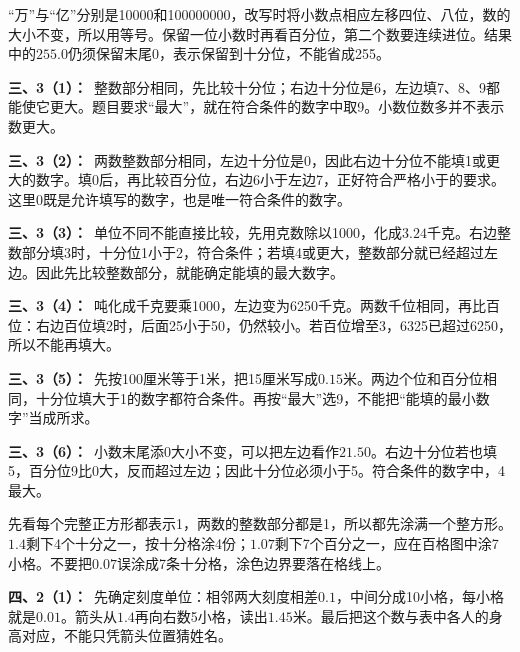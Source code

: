\documentclass[multi=snippet,border=0pt]{standalone}
\newenvironment{snippet}[3]{\begin{minipage}{#1bp}\color{answerred}\fontsize{#2}{#3}\selectfont\raggedright}{\end{minipage}}
\begin{document}
\begin{snippet}{505}{11.5}{14}“万”与“亿”分别是10000和100000000，改写时将小数点相应左移四位、八位，数的大小不变，所以用等号。保留一位小数时再看百分位，第二个数要连续进位。结果中的\(255.0\)仍须保留末尾0，表示保留到十分位，不能省成255。\end{snippet}
\begin{snippet}{505}{11.5}{14}\textbf{三、3（1）：}\ 整数部分相同，先比较十分位；右边十分位是6，左边填7、8、9都能使它更大。题目要求“最大”，就在符合条件的数字中取9。小数位数多并不表示数更大。\end{snippet}
\begin{snippet}{505}{11.5}{14}\textbf{三、3（2）：}\ 两数整数部分相同，左边十分位是0，因此右边十分位不能填1或更大的数字。填0后，再比较百分位，右边6小于左边7，正好符合严格小于的要求。这里0既是允许填写的数字，也是唯一符合条件的数字。\end{snippet}
\begin{snippet}{505}{11.5}{14}\textbf{三、3（3）：}\ 单位不同不能直接比较，先用克数除以1000，化成\(3.24\)千克。右边整数部分填3时，十分位1小于2，符合条件；若填4或更大，整数部分就已经超过左边。因此先比较整数部分，就能确定能填的最大数字。\end{snippet}
\begin{snippet}{505}{11.5}{14}\textbf{三、3（4）：}\ 吨化成千克要乘1000，左边变为6250千克。两数千位相同，再比百位：右边百位填2时，后面25小于50，仍然较小。若百位增至3，6325已超过6250，所以不能再填大。\end{snippet}
\begin{snippet}{505}{11.5}{14}\textbf{三、3（5）：}\ 先按100厘米等于1米，把15厘米写成\(0.15\)米。两边个位和百分位相同，十分位填大于1的数字都符合条件。再按“最大”选9，不能把“能填的最小数字”当成所求。\end{snippet}
\begin{snippet}{505}{11.5}{14}\textbf{三、3（6）：}\ 小数末尾添0大小不变，可以把左边看作\(21.50\)。右边十分位若也填5，百分位9比0大，反而超过左边；因此十分位必须小于5。符合条件的数字中，4最大。\end{snippet}
\begin{snippet}{505}{11.5}{14}先看每个完整正方形都表示1，两数的整数部分都是1，所以都先涂满一个整方形。\(1.4\)剩下4个十分之一，按十分格涂4份；\(1.07\)剩下7个百分之一，应在百格图中涂7小格。不要把\(0.07\)误涂成7条十分格，涂色边界要落在格线上。\end{snippet}
\begin{snippet}{505}{11.5}{14}\textbf{四、2（1）：}\ 先确定刻度单位：相邻两大刻度相差\(0.1\)，中间分成10小格，每小格就是\(0.01\)。箭头从\(1.4\)再向右数5小格，读出\(1.45\)米。最后把这个数与表中各人的身高对应，不能只凭箭头位置猜姓名。\end{snippet}
\end{document}
